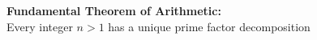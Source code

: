 \documentclass[preview]{standalone}
\begin{document}
\begin{center}
\textbf{Fundamental Theorem of Arithmetic:}\\Every integer $n > 1$ has a unique prime factor decomposition\\
\end{center}
\end{document}
